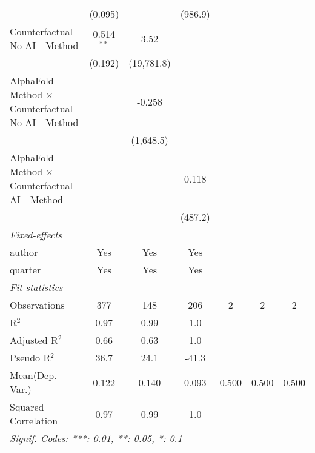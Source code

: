\begin{tabular}{lcccccc}
                                                              & (0.095)      &              & (986.9)        &     &     &   \\   
   Counterfactual No AI - Method                              & 0.514$^{**}$ & 3.52         &                &     &     &   \\   
                                                              & (0.192)      & (19,781.8)   &                &     &     &   \\   
   AlphaFold - Method $\times$ Counterfactual No AI - Method  &              & -0.258       &                &     &     &   \\   
                                                              &              & (1,648.5)    &                &     &     &   \\   
   AlphaFold - Method $\times$ Counterfactual AI - Method     &              &              & 0.118          &     &     &   \\   
                                                              &              &              & (487.2)        &     &     &   \\   
   \midrule
   \emph{Fixed-effects}\\
   author                                                     & Yes          & Yes          & Yes            &     &     & \\  
   quarter                                                    & Yes          & Yes          & Yes            &     &     & \\  
   \midrule
   \emph{Fit statistics}\\
   Observations                                               & 377          & 148          & 206            & 2   & 2   & 2\\  
   R$^2$                                                      & 0.97         & 0.99         & 1.0            &     &     & \\  
   Adjusted R$^2$                                             & 0.66         & 0.63         & 1.0            &     &     & \\  
   Pseudo R$^2$                                               & 36.7         & 24.1         & -41.3          &     &     & \\  
Mean(Dep. Var.) & 0.122 & 0.140 & 0.093 & 0.500 & 0.500 & 0.500 \\
   Squared Correlation                                        & 0.97         & 0.99         & 1.0            &     &     & \\  
   \midrule \midrule
   \multicolumn{7}{l}{\emph{Signif. Codes: ***: 0.01, **: 0.05, *: 0.1}}\\
\end{tabular}
\par\endgroup
